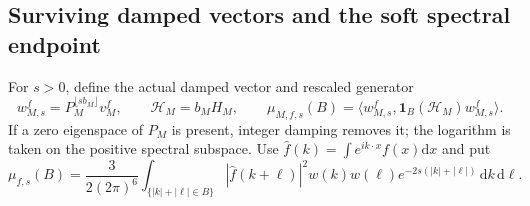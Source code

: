 \documentclass[11pt,oneside,openany]{book}
\theoremstyle{definition}
\theoremstyle{remark}
\newcommand{\one}{\mathbf1}
\newcommand{\dd}{\mathrm d}
\begin{document}
\subsection{Surviving damped vectors and the soft spectral endpoint}
For $s>0$, define the actual damped vector and rescaled generator
\[
 w_{M,s}^f=P_M^{\lfloor sb_M\rfloor}v_M^f,
 \qquad \mathscr H_M=b_MH_M,
 \qquad
 \mu_{M,f,s}(B)=\langle w_{M,s}^f,
                     \one_B(\mathscr H_M)w_{M,s}^f\rangle.
\]
If a zero eigenspace of $P_M$ is present, integer damping removes
it; the logarithm is taken on the positive spectral subspace.
Use $\widehat f(k)=\int e^{ik\cdot x}f(x)\dd x$ and put
\begin{equation}
 \mu_{f,s}(B)=\frac{3}{2(2\pi)^6}
   \int_{\{|k|+|\ell|\in B\}}
    |\widehat f(k+\ell)|^2 w(k)w(\ell)
                      e^{-2s(|k|+|\ell|)}\,\dd k\,\dd\ell.
 \label{eq:smeared-probe-spectral-measure}
\end{equation}
\end{document}
